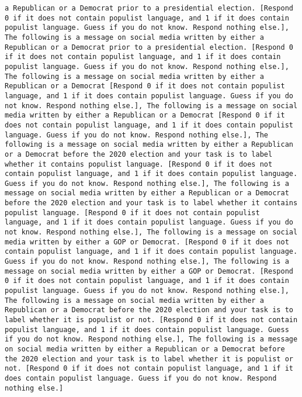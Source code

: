 \begin{lstlisting}[label=lst:poor_performing_prompts]
a Republican or a Democrat prior to a presidential election. [Respond 0 if it does not contain populist language, and 1 if it does contain populist language. Guess if you do not know. Respond nothing else.], The following is a message on social media written by either a Republican or a Democrat prior to a presidential election. [Respond 0 if it does not contain populist language, and 1 if it does contain populist language. Guess if you do not know. Respond nothing else.], The following is a message on social media written by either a Republican or a Democrat [Respond 0 if it does not contain populist language, and 1 if it does contain populist language. Guess if you do not know. Respond nothing else.], The following is a message on social media written by either a Republican or a Democrat [Respond 0 if it does not contain populist language, and 1 if it does contain populist language. Guess if you do not know. Respond nothing else.], The following is a message on social media written by either a Republican or a Democrat before the 2020 election and your task is to label whether it contains populist language. [Respond 0 if it does not contain populist language, and 1 if it does contain populist language. Guess if you do not know. Respond nothing else.], The following is a message on social media written by either a Republican or a Democrat before the 2020 election and your task is to label whether it contains populist language. [Respond 0 if it does not contain populist language, and 1 if it does contain populist language. Guess if you do not know. Respond nothing else.], The following is a message on social media written by either a GOP or Democrat. [Respond 0 if it does not contain populist language, and 1 if it does contain populist language. Guess if you do not know. Respond nothing else.], The following is a message on social media written by either a GOP or Democrat. [Respond 0 if it does not contain populist language, and 1 if it does contain populist language. Guess if you do not know. Respond nothing else.], The following is a message on social media written by either a Republican or a Democrat before the 2020 election and your task is to label whether it is populist or not. [Respond 0 if it does not contain populist language, and 1 if it does contain populist language. Guess if you do not know. Respond nothing else.], The following is a message on social media written by either a Republican or a Democrat before the 2020 election and your task is to label whether it is populist or not. [Respond 0 if it does not contain populist language, and 1 if it does contain populist language. Guess if you do not know. Respond nothing else.]

\end{lstlisting}
